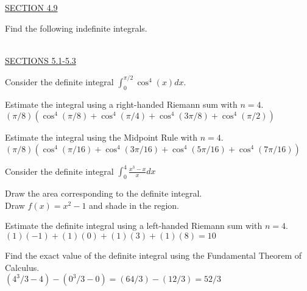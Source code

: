 \documentclass{exam}
\begin{document}
\underline{SECTION 4.9}

\begin{questions}

\question Find the following indefinite integrals.

\ \\
\underline{SECTIONS 5.1-5.3}

\question Consider the definite integral $\displaystyle\int_0^{\pi/2}\cos^4(x)dx$.
  \begin{parts}
  \item Estimate the integral using a right-handed Riemann sum with $n=4$. 
  \\ {\color{red} $(\pi/8)(\cos^4(\pi/8)+\cos^4(\pi/4)+\cos^4(3\pi/8)+\cos^4(\pi/2))$}
  \item Estimate the integral using the Midpoint Rule with $n=4$. 
  \\ {\color{red} $(\pi/8)(\cos^4(\pi/16)+\cos^4(3\pi/16)+\cos^4(5\pi/16)+\cos^4(7\pi/16))$}
  \end{parts}
\question Consider the definite integral $\displaystyle\int_0^4 \frac{x^3-x}{x}dx$
  \begin{parts}
  \item Draw the area corresponding to the definite integral. 
  \\ {\color{red} Draw $f(x) = x^2 - 1$ and shade in the region.}
  \item Estimate the definite integral using a left-handed Riemann sum with $n=4$. 
  \\ {\color{red} $  (1)(-1) + (1)(0) + (1)(3) + (1)(8) = 10$}
  \item Find the exact value of the definite integral using the Fundamental Theorem of Calculus. 
  \\ {\color{red} $  (4^3/3 - 4) - (0^3/3 - 0) = (64/3) - (12/3) = 52/3$}
  \end{parts}
  

\end{questions}
\end{document}

